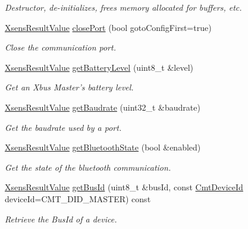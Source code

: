 \begin{DoxyCompactItemize}
\begin{DoxyCompactList}\small\item\em \-Destructor, de-\/initializes, frees memory allocated for buffers, etc. \end{DoxyCompactList}\item 
\hyperlink{group__enums_ga822a2260a20af524029eef9e9a51ff6f}{\-Xsens\-Result\-Value} \hyperlink{classxsens_1_1Cmt3_a3c1feb413892d464eaa07858cc55e864}{close\-Port} (bool goto\-Config\-First=true)
\begin{DoxyCompactList}\small\item\em \-Close the communication port. \end{DoxyCompactList}\item 
\hyperlink{group__enums_ga822a2260a20af524029eef9e9a51ff6f}{\-Xsens\-Result\-Value} \hyperlink{classxsens_1_1Cmt3_acbe6d1dbac94db0a895975568be4d5f4}{get\-Battery\-Level} (uint8\-\_\-t \&level)
\begin{DoxyCompactList}\small\item\em \-Get an \-Xbus \-Master's battery level. \end{DoxyCompactList}\item 
\hyperlink{group__enums_ga822a2260a20af524029eef9e9a51ff6f}{\-Xsens\-Result\-Value} \hyperlink{classxsens_1_1Cmt3_a82fb5502b5848a3ef99becdd635dac58}{get\-Baudrate} (uint32\-\_\-t \&baudrate)
\begin{DoxyCompactList}\small\item\em \-Get the baudrate used by a port. \end{DoxyCompactList}\item 
\hyperlink{group__enums_ga822a2260a20af524029eef9e9a51ff6f}{\-Xsens\-Result\-Value} \hyperlink{classxsens_1_1Cmt3_a413d7833b43fd7eaad326587e8a95ed7}{get\-Bluetooth\-State} (bool \&enabled)
\begin{DoxyCompactList}\small\item\em \-Get the state of the bluetooth communication. \end{DoxyCompactList}\item 
\hyperlink{group__enums_ga822a2260a20af524029eef9e9a51ff6f}{\-Xsens\-Result\-Value} \hyperlink{classxsens_1_1Cmt3_a3354a5d11078411ff0927a70b84a16c2}{get\-Bus\-Id} (uint8\-\_\-t \&bus\-Id, const \hyperlink{cmtdef_8h_a2e3b6a17360828d440ee848959918af2}{\-Cmt\-Device\-Id} device\-Id=\-C\-M\-T\-\_\-\-D\-I\-D\-\_\-\-M\-A\-S\-T\-E\-R) const 
\begin{DoxyCompactList}\small\item\em \-Retrieve the \-Bus\-Id of a device. \end{DoxyCompactList}\item 

\end{DoxyCompactItemize}
